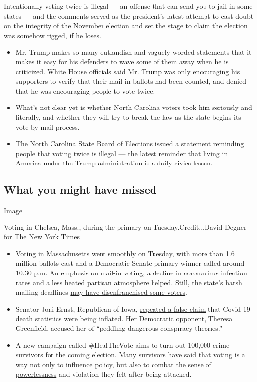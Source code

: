 Intentionally voting twice is illegal --- an offense that can send you
to jail in some states --- and the comments served as the president's
latest attempt to cast doubt on the integrity of the November election
and set the stage to claim the election was somehow rigged, if he loses.

\begin{itemize}
\item
  Mr. Trump makes so many outlandish and vaguely worded statements that
  it makes it easy for his defenders to wave some of them away when he
  is criticized. White House officials said Mr. Trump was only
  encouraging his supporters to verify that their mail-in ballots had
  been counted, and denied that he was encouraging people to vote twice.
\item
  What's not clear yet is whether North Carolina voters took him
  seriously and literally, and whether they will try to break the law as
  the state begins its vote-by-mail process.
\item
  The North Carolina State Board of Elections issued a statement
  reminding people that voting twice is illegal --- the latest reminder
  that living in America under the Trump administration is a daily
  civics lesson.
\end{itemize}

\hypertarget{what-you-might-have-missed}{%
\subsection{What you might have
missed}\label{what-you-might-have-missed}}

Image

Voting in Chelsea, Mass., during the primary on Tuesday.Credit...David
Degner for The New York Times

\begin{itemize}
\item
  Voting in Massachusetts went smoothly on Tuesday, with more than 1.6
  million ballots cast and a Democratic Senate primary winner called
  around 10:30 p.m. An emphasis on mail-in voting, a decline in
  coronavirus infection rates and a less heated partisan atmosphere
  helped. Still, the state's harsh mailing deadlines
  \href{https://www.nytimes3xbfgragh.onion/2020/09/02/us/politics/massachusetts-election-voting.html}{may
  have disenfranchised some voters}.
\item
  Senator Joni Ernst, Republican of Iowa,
  \href{https://www.nytimes3xbfgragh.onion/2020/09/02/us/politics/joni-ernst-coronavirus.html}{repeated
  a false claim} that Covid-19 death statistics were being inflated. Her
  Democratic opponent, Theresa Greenfield, accused her of ``peddling
  dangerous conspiracy theories.''
\item
  A new campaign called \#HealTheVote aims to turn out 100,000 crime
  survivors for the coming election. Many survivors have said that
  voting is a way not only to influence policy,
  \href{https://www.nytimes3xbfgragh.onion/2020/09/04/us/politics/voting-crime-survivors.html}{but
  also to combat the sense of powerlessness} and violation they felt
  after being attacked.
\end{itemize}

